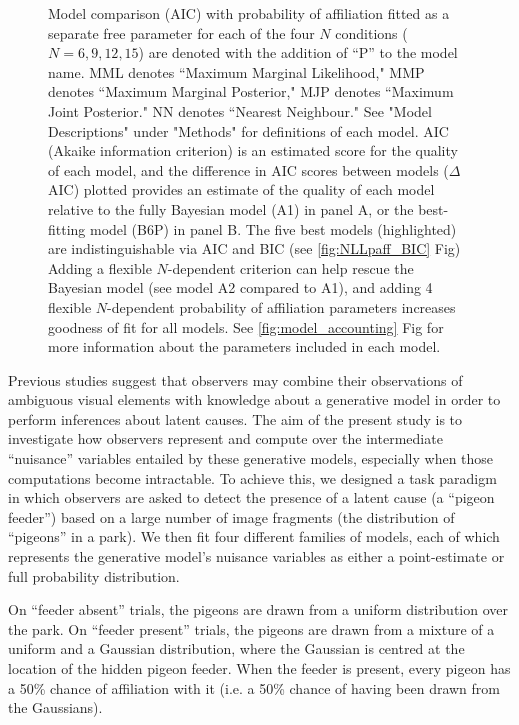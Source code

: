 \documentclass{article}
\begin{document}
\begin{figure}[ht]
\begin{center}
\hspace*{-2cm}
   \caption{Model comparison (AIC) with probability of affiliation fitted as a separate free parameter for each of the four $N$ conditions ($N=6, 9, 12, 15$) are denoted with the addition of ``P'' to the model name. MML denotes ``Maximum Marginal Likelihood," MMP denotes ``Maximum Marginal Posterior," MJP denotes ``Maximum Joint Posterior." NN denotes ``Nearest Neighbour." See "Model Descriptions" under "Methods" for definitions of each model. AIC (Akaike information criterion) is an estimated score for the quality of each model, and the difference in AIC scores between models ($\Delta$ AIC) plotted provides an estimate of the quality of each model relative to the fully Bayesian model (A1) in panel A, or the best-fitting model (B6P) in panel B. The five best models (highlighted) are indistinguishable via AIC and BIC (see \ref{fig:NLLpaff_BIC} Fig) Adding a flexible $N$-dependent criterion can help rescue the Bayesian model (see model A2 compared to A1), and adding 4 flexible $N$-dependent probability of affiliation parameters increases goodness of fit for all models. See \ref{fig:model_accounting} Fig for more information about the parameters included in each model.}
   \label{fig:NLLpaff_AIC}
\end{center}
\end{figure}

Previous studies suggest that observers may combine their observations of ambiguous visual elements with knowledge about a generative model in order to perform inferences about latent causes. The aim of the present study is to investigate how observers represent and compute over the intermediate ``nuisance'' variables entailed by these generative models, especially when those computations become intractable. To achieve this, we designed a task paradigm in which observers are asked to detect the presence of a latent cause (a ``pigeon feeder'') based on a large number of image fragments (the distribution of ``pigeons'' in a park). We then fit four different families of models, each of which represents the generative model's nuisance variables as either a point-estimate or full probability distribution.

On ``feeder absent'' trials, the pigeons are drawn from a uniform distribution over the park. On ``feeder present'' trials, the pigeons are drawn from a mixture of a uniform and a Gaussian distribution, where the Gaussian is centred at the location of the hidden pigeon feeder. When the feeder is present, every pigeon has a 50\% chance of affiliation with it (i.e. a 50\% chance of having been drawn from the Gaussians). 
\end{document}
